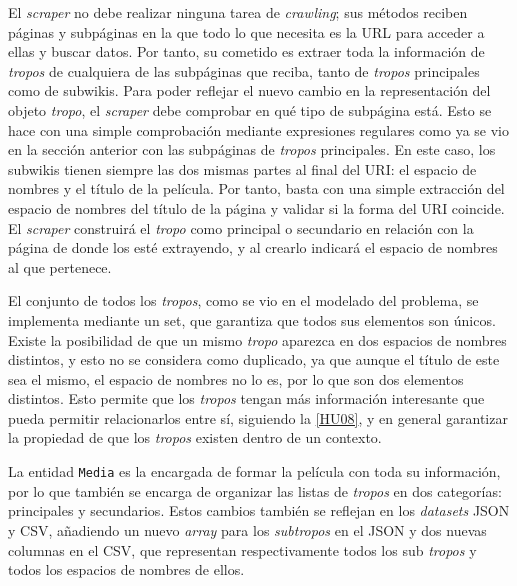 El \textit{scraper} no debe realizar ninguna tarea de \textit{crawling}; sus
métodos reciben páginas y subpáginas en la que todo lo que necesita es la URL
para acceder a ellas y buscar datos. Por tanto, su cometido es extraer toda la
información de \textit{tropos} de cualquiera de las subpáginas que reciba,
tanto de \textit{tropos} principales como de subwikis. Para poder reflejar el
nuevo cambio en la representación del objeto \textit{tropo}, el \textit{scraper}
debe comprobar en qué tipo de subpágina está. Esto se hace con una simple
comprobación mediante expresiones regulares como ya se vio en la sección
anterior con las subpáginas de \textit{tropos} principales. En este caso, los
subwikis tienen siempre las dos mismas partes al final del URI: el espacio de
nombres y el título de la película. Por tanto, basta con una simple extracción
del espacio de nombres del título de la página y validar si la forma del URI
coincide. El \textit{scraper} construirá el \textit{tropo} como principal o
secundario en relación con la página de donde los esté extrayendo, y al crearlo
indicará el espacio de nombres al que pertenece.

El conjunto de todos los \textit{tropos}, como se vio en el modelado del
problema, se implementa mediante un set, que garantiza que todos sus elementos
son únicos. Existe la posibilidad de que un mismo \textit{tropo} aparezca en dos
espacios de nombres distintos, y esto no se considera como duplicado, ya que
aunque el título de este sea el mismo, el espacio de nombres no lo es, por lo
que son dos elementos distintos. Esto permite que los \textit{tropos} tengan más
información interesante que pueda permitir relacionarlos entre sí, siguiendo la
\href{https://github.com/jlgallego99/TropesToGo/issues/57}{[HU08]}, y en general
garantizar la propiedad de que los \textit{tropos} existen dentro de un
contexto.

La entidad \texttt{Media} es la encargada de formar la película con toda su
información, por lo que también se encarga de organizar las listas de
\textit{tropos} en dos categorías: principales y secundarios. Estos
cambios también se reflejan en los \textit{datasets} JSON y CSV, añadiendo un
nuevo \textit{array} para los \textit{subtropos} en el JSON y dos nuevas
columnas en el CSV, que representan respectivamente todos los sub
\textit{tropos} y todos los espacios de nombres de ellos.

